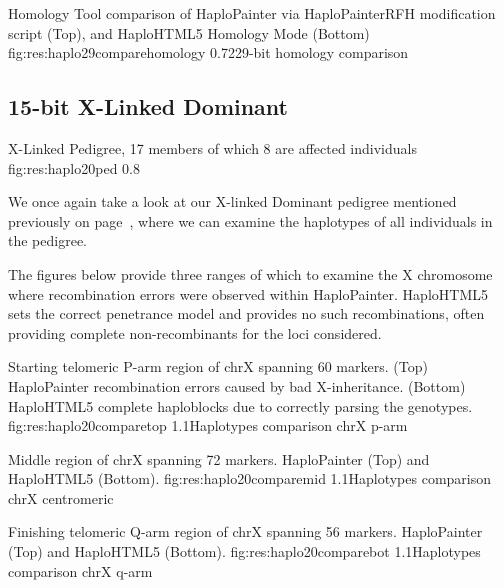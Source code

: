 	{Homology Tool comparison of HaploPainter via HaploPainterRFH modification script (Top), and HaploHTML5 Homology Mode (Bottom)}
	{fig:res:haplo29comparehomology}
	{0.72}{29-bit homology comparison}

\subsection{15-bit X-Linked Dominant}

	{X-Linked Pedigree, 17 members of which 8 are affected individuals}
	{fig:res:haplo20ped}
	{0.8}{}

We once again take a look at our X-linked Dominant pedigree mentioned previously on page~\pageref{fig:res:15summary}, where we can examine the haplotypes of all individuals in the pedigree.

The figures below provide three ranges of which to examine the X chromosome where recombination errors were observed within HaploPainter. HaploHTML5 sets the correct penetrance model and provides no such recombinations, often providing complete non-recombinants for the loci considered.


	{Starting telomeric P-arm region of chrX spanning 60 markers. (Top) HaploPainter recombination errors caused by bad X-inheritance. (Bottom) HaploHTML5 complete haploblocks due to correctly parsing the genotypes.}
	{fig:res:haplo20comparetop}
	{1.1}{Haplotypes comparison chrX p-arm}


	{Middle region of chrX spanning 72 markers. HaploPainter (Top) and HaploHTML5 (Bottom).}
	{fig:res:haplo20comparemid}
	{1.1}{Haplotypes comparison chrX centromeric}


	{Finishing telomeric Q-arm region of chrX spanning 56 markers. HaploPainter (Top) and HaploHTML5 (Bottom).}
	{fig:res:haplo20comparebot}
	{1.1}{Haplotypes comparison chrX q-arm}



